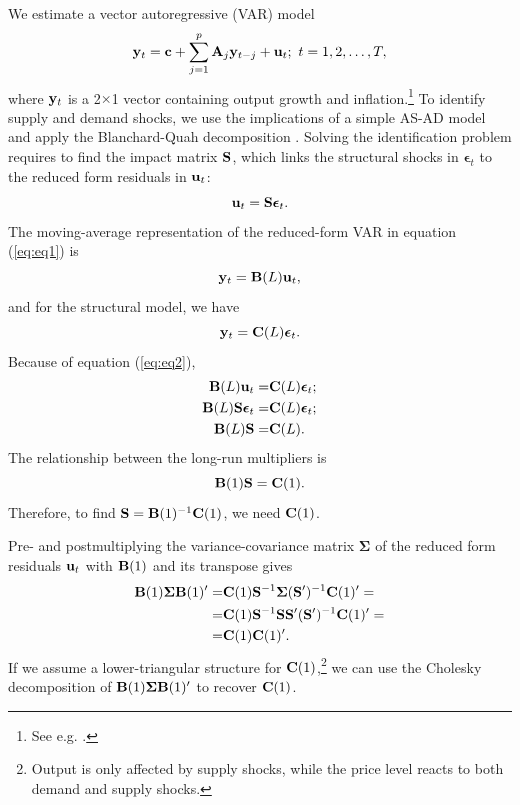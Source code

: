 \documentclass[a4paper,12pt]{article}
\newcommand{\bs}[1]{\boldsymbol{#1}}
\begin{document}
We estimate a vector autoregressive (VAR) model
\begin{equation}\label{eq:eq1}
    {\bf y}_t={\bf c}+\sum_{j=1}^p{\bf A}_j{\bf y}_{t-j}+{\bf u}_t; \ t=1,2,\ldots,T,
  \end{equation}
where ${\bf y}_t$ is a 2$\times$1 vector containing output growth and inflation.\footnote{See e.g. \citet[Chapter 6]{favero2001}.} To identify supply and demand shocks, we use the implications of a simple AS-AD model and apply the Blanchard-Quah decomposition \citep{blanchardquah89}. Solving the identification problem requires to find the impact matrix ${\bf S}$, which links the structural shocks in $\bs{\epsilon}_t$ to the reduced form residuals in ${\bf u}_t$:
\begin{equation}
  \label{eq:eq2}
  {\bf u}_t={\bf S}\bs{\epsilon}_t.
\end{equation}
The moving-average representation of the reduced-form VAR in equation (\ref{eq:eq1}) is
\begin{equation}
  \label{eq:eq3}
  {\bf y}_t={\bf B}(L){\bf u}_t,
\end{equation}
and for the structural model, we have
\begin{equation}
  \label{eq:eq4}
  {\bf y}_t={\bf C}(L)\bs{\epsilon}_t.
\end{equation}
Because of equation (\ref{eq:eq2}), 
\begin{equation}
  \label{eq:eq5}
  \begin{split}
    {\bf B}(L){\bf u}_t=&{\bf C}(L)\bs{\epsilon}_t;\\
{\bf B}(L){\bf S}\bs{\epsilon}_t=&{\bf C}(L)\bs{\epsilon}_t;\\
{\bf B}(L){\bf S}=&{\bf C}(L).
  \end{split}
\end{equation}
The relationship between the long-run multipliers is
\begin{equation}
  \label{eq:eq6}
  {\bf B}(1){\bf S}={\bf C}(1).
\end{equation}
Therefore, to find ${\bf S}={\bf B}(1)^{-1}{\bf C}(1)$, we need ${\bf C}(1)$.

Pre- and postmultiplying the variance-covariance matrix $\bs{\Sigma}$ of the reduced form residuals ${\bf u}_t$ with ${\bf B}(1)$ and its transpose gives
\begin{equation}
  \label{eq:eq7}
  \begin{split}
  {\bf B}(1)\bs{\Sigma}{\bf B}(1)^{\prime}=&{\bf C}(1){\bf S}^{-1}\bs{\Sigma}({\bf S}^{\prime})^{-1}{\bf C}(1)^{\prime}=\\=&{\bf C}(1){\bf S}^{-1}{\bf S}{\bf S}^{\prime}({\bf S}^{\prime})^{-1}{\bf C}(1)^{\prime}=\\=&{\bf C}(1){\bf C}(1)^{\prime}.
      \end{split}
\end{equation}
If we assume a lower-triangular structure for ${\bf C}(1)$,\footnote{Output is only affected by supply shocks, while the price level reacts to both demand and supply shocks.} we can use the Cholesky decomposition of ${\bf B}(1)\bs{\Sigma}{\bf B}(1)^{\prime}$ to recover ${\bf C}(1)$.
\end{document}
